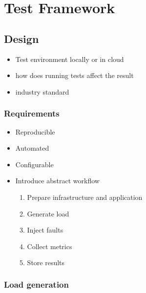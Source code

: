 \chapter{Test Framework}

\section{Design}

\begin{itemize}
	\item Test environment locally or in cloud
	\item how does running tests affect the result
	\item industry standard
\end{itemize}

\subsection{Requirements}

\begin{itemize}
	\item Reproducible
	\item Automated
	\item Configurable
	\item Introduce abstract workflow \begin{enumerate}
		\item Prepare infrastructure and application
		\item Generate load
		\item Inject faults
		\item Collect metrics
		\item Store results
	\end{enumerate}
\end{itemize}


\subsection{Load generation}

